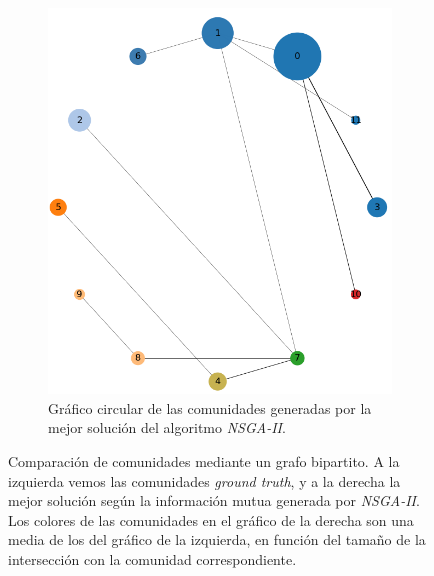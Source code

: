 \begin{figure}[!htb]
\begin{subfigure}{.4\textwidth}
    \includegraphics[width=.9\linewidth]{img/3_best_sol_circular_comp_2}
    \caption{Gráfico circular de las comunidades generadas por la mejor
      solución del algoritmo \emph{NSGA-II}. }
    \label{fig:3-circular-comp-2}
  \end{subfigure}
  \caption{Comparación de comunidades mediante un grafo bipartito. A la
    izquierda vemos las comunidades \emph{ground truth}, y a la derecha la
    mejor solución según la información mutua generada por \emph{NSGA-II}. Los
    colores de las comunidades en el gráfico de la derecha son una media de los
    del gráfico de la izquierda, en función del tamaño de la intersección con la
    comunidad correspondiente.}
  \label{fig:3-circular-comp}
\end{figure}

